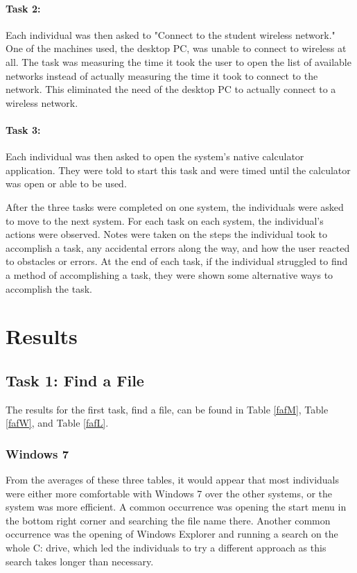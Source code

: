 \documentclass[11pt,letterpaper]{report}
\begin{document}
\paragraph{Task 2:} Each individual was then asked to "Connect to the student wireless network." One of the machines used, the desktop PC, was unable to connect to wireless at all. The task was measuring the time it took the user to open the list of available networks instead of actually measuring the time it took to connect to the network. This eliminated the need of the desktop PC to actually connect to a wireless network. 

\paragraph{Task 3:} Each individual was then asked to open the system's native calculator application. They were told to start this task and were timed until the calculator was open or able to be used. 

After the three tasks were completed on one system, the individuals were asked to move to the next system. For each task on each system, the individual's actions were observed. Notes were taken on the steps the individual took to accomplish a task, any accidental errors along the way, and how the user reacted to obstacles or errors. At the end of each task, if the individual struggled to find a method of accomplishing a task, they were shown some alternative ways to accomplish the task.  

\section{Results}

\subsection{Task 1: Find a File}
The results for the first task, find a file, can be found in Table \ref{fafM}, Table \ref{fafW}, and Table \ref{fafL}. 

\subsubsection{Windows 7}
From the averages of these three tables, it would appear that most individuals were either more comfortable with Windows 7 over the other systems, or the system was more efficient. A common occurrence was opening the start menu in the bottom right corner and searching the file name there. Another common occurrence was the opening of Windows Explorer and running a search on the whole C: drive, which led the individuals to try a different approach as this search takes longer than necessary.
\end{document}
